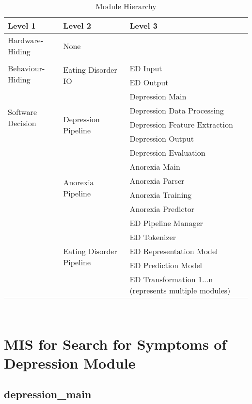 \documentclass[12pt, titlepage]{article}
\begin{document}
\begin{table}[h!]
\centering
\begin{tabular}{p{} p{} p{}}
\toprule
\textbf{Level 1} & \textbf{Level 2} & \textbf{Level 3}\\
\midrule

{Hardware-Hiding} & None \\
\midrule

\multirow{3}{*}{Behaviour-Hiding} & \\ \cline{2-3}
& \multirow{2}{*}{Eating Disorder IO} & ED Input\\
& & ED Output\\
\midrule

\multirow{4}{*}{Software Decision} 
& \multirow{5}{*}{Depression Pipeline} & Depression Main\\ 
& & Depression Data Processing\\
& & Depression Feature Extraction\\
& & Depression Output\\ 
& & Depression Evaluation\\\cline{2-3}
& \multirow{4}{*}{Anorexia Pipeline} & Anorexia Main\\ 
& & Anorexia Parser\\
& & Anorexia Training\\
& & Anorexia Predictor\\ \cline{2-3}
& \multirow{5}{*}{Eating Disorder Pipeline} & ED Pipeline Manager\\
& & ED Tokenizer\\
& & ED Representation Model\\
& & ED Prediction Model\\
& & ED Transformation 1...n (represents multiple modules)\\
\bottomrule

\end{tabular}
\caption{Module Hierarchy}
\label{TblMH}
\end{table}

\newpage
~\newpage

\section{MIS for Search for Symptoms of Depression Module} \label{Module} 

\subsection{depression\_main}
\end{document}

